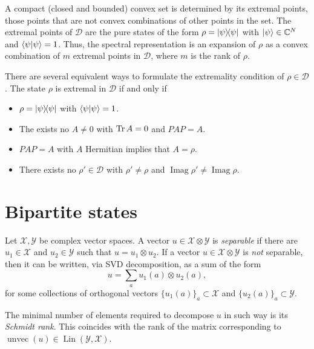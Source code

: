 \documentclass[12pt]{report}
\newcommand{\on}[1]{\operatorname{#1}}
\newcommand{\calY}{{\mathcal{Y}}}
\newcommand{\calX}{{\mathcal{X}}}
\DeclareMathOperator{\Imag}{Imag}
\DeclareMathOperator{\Lin}{Lin}
\begin{document}
A compact (closed and bounded) convex set is determined by its extremal points,
those points that are not convex combinations of other points in the set.
The extremal points of $\mathcal D$ are the pure states of the form
$\rho=\ketbra\psi$ with $\ket\psi\in\mathbb C^N$ and $\braket\psi=1$.
Thus, the spectral representation is an expansion of $\rho$ as a convex combination of $m$ extremal points in $\mathcal D$, where $m$ is the rank of $\rho$.

There are several equivalent ways to formulate the extremality condition of $\rho \in\mathcal D$.
The state $\rho$ is extremal in $\mathcal D$ if and only if
\begin{itemize}
	\item $\rho = \ketbra\psi$ with $\braket\psi=1$.
	\item The exists no $A\neq 0$ with $\Tr A=0$ and $PAP=A$.
	\item $PAP=A$ with $A$ Hermitian implies that $A=\rho$.
	\item There exists no $\rho'\in\mathcal D$ with $\rho'\neq\rho$ and $\Imag\rho'\neq\Imag\rho$.
\end{itemize}

\section{Bipartite states}

\begin{defn}
	Let $\calX,\calY$ be complex vector spaces.
	A vector $u\in\calX\otimes\calY$ is \emph{separable} if there are $u_1\in\calX$ and $u_2\in\calY$ such that $u=u_1\otimes u_2$.
	If a vector $u\in\calX\otimes \calY$ is \emph{not} separable, then it can be written, via SVD decomposition, as a sum of the form
	\begin{equation}
		u = \sum_a u_1(a) \otimes u_2(a),
	\end{equation}
	for some collections of orthogonal vectors $\{u_1(a)\}_a\subset\calX$ and $\{u_2(a)\}_a\subset\calY$.

	The minimal number of elements required to decompose $u$ in such way is its \emph{Schmidt rank}.
	This coincides with the rank of the matrix corresponding to $\on{unvec}(u)\in\Lin(\calY,\calX)$.
\end{defn}
\end{document}
